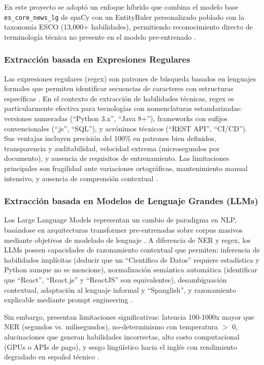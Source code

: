 En este proyecto se adoptó un enfoque híbrido que combina el modelo base \texttt{es\_core\_news\_lg} de spaCy con un EntityRuler personalizado poblado con la taxonomía ESCO (13,000+ habilidades), permitiendo reconocimiento directo de terminología técnica no presente en el modelo pre-entrenado \cite{decorte2021}.

\subsubsection{Extracción basada en Expresiones Regulares}

Las expresiones regulares (regex) son patrones de búsqueda basados en lenguajes formales que permiten identificar secuencias de caracteres con estructuras específicas \cite{friedl2006}. En el contexto de extracción de habilidades técnicas, regex es particularmente efectiva para tecnologías con nomenclaturas estandarizadas: versiones numeradas (``Python 3.x'', ``Java 8+''), frameworks con sufijos convencionales (``.js'', ``SQL''), y acrónimos técnicos (``REST API'', ``CI/CD''). Sus ventajas incluyen precisión del 100\% en patrones bien definidos, transparencia y auditabilidad, velocidad extrema (microsegundos por documento), y ausencia de requisitos de entrenamiento. Las limitaciones principales son fragilidad ante variaciones ortográficas, mantenimiento manual intensivo, y ausencia de comprensión contextual \cite{chiticariu2013}.

\subsubsection{Extracción basada en Modelos de Lenguaje Grandes (LLMs)}

Los Large Language Models representan un cambio de paradigma en NLP, basándose en arquitecturas transformer pre-entrenadas sobre corpus masivos mediante objetivos de modelado de lenguaje \cite{brown2020, touvron2023}. A diferencia de NER y regex, los LLMs poseen capacidades de razonamiento contextual que permiten: inferencia de habilidades implícitas (deducir que un ``Científico de Datos'' requiere estadística y Python aunque no se mencione), normalización semántica automática (identificar que ``React'', ``React.js'' y ``ReactJS'' son equivalentes), desambiguación contextual, adaptación al lenguaje informal y ``Spanglish'', y razonamiento explicable mediante prompt engineering \cite{zhang2023, wei2023, vilares2016}.

Sin embargo, presentan limitaciones significativas: latencia 100-1000x mayor que NER (segundos vs. milisegundos), no-determinismo con temperatura $>$ 0, alucinaciones que generan habilidades incorrectas, alto costo computacional (GPUs o APIs de pago), y sesgo lingüístico hacia el inglés con rendimiento degradado en español técnico \cite{elazar2023, ji2023, banon2020}.

